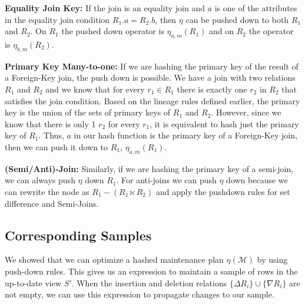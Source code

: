 \textbf{Equality Join Key: } If the join is an equality join and $a$ is one of the attributes in the equality join condition $R_1.a = R_2.b$, then $\eta$ can be pushed down to both $R_1$ and $R_2$. On $R_1$ the pushed down operator is $\eta_{a, m}(R_1)$ and on $R_2$ the operator is $\eta_{b, m}(R_2)$.

\textbf{Primary Key Many-to-one: } If we are hashing the primary key of the result of a Foreign-Key join, the push down is possible. We have a join with two relations $R_1$ and $R_2$ and we know that for every $r_1 \in R_1$ there is exactly one $r_2$ in $R_2$ that satisfies the join condition. Based on the lineage rules defined earlier, the primary key is the union of the sets of primary keys of $R_1$ and $R_2$. However, since we know that there is only 1 $r_2$ for every $r_1$, it is equivalent to hash just the primary key of $R_1$. Thus, $a$ in our hash function is the primary key of a Foreign-Key join, then we can push it down to $R_1$, $\eta_{a, m}(R_1)$. 

\textbf{(Semi/Anti)-Join: } Similarly, if we are hashing the primary key of a semi-join, we can always push $\eta$ down $R_1$. For anti-joins we can push $\eta$ down because we can rewrite the node as $R_1 - (R_1 \ltimes R_2) $ and apply the pushdown rules for set difference and Semi-Joins.

\subsection{Corresponding Samples}
We showed that we can optimize a hashed maintenance plan $\eta(\mathcal{M})$ by using push-down rules.
This gives us an expression to maintain a sample of rows in the up-to-date view $S'$.
When the insertion and deletion relations $\{\Delta R_i\} \cup \{\nabla R_i\}$ are not empty, we can use
this expression to propagate changes to our sample.


